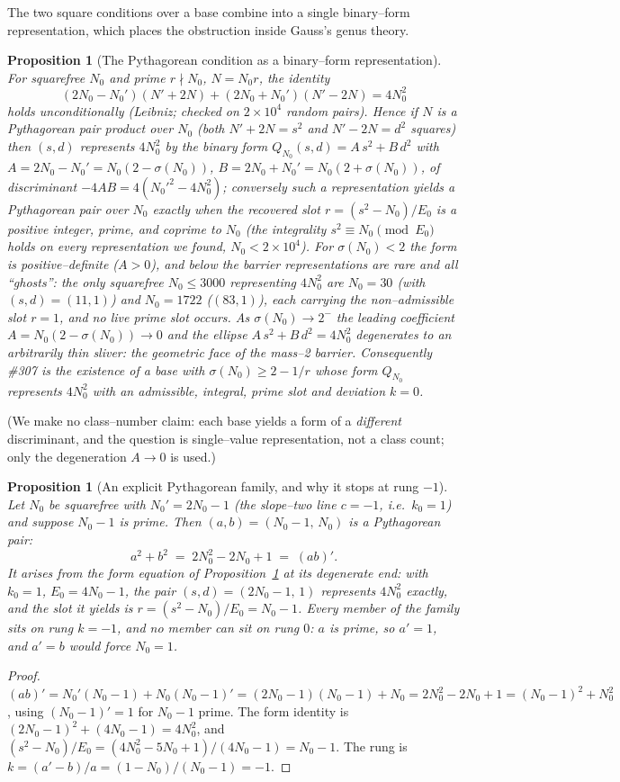 \documentclass[11pt]{article}
\newtheorem{proposition}[theorem]{Proposition}
\theoremstyle{definition}
\begin{document}
The two square conditions over a base combine into a single binary--form representation, which places
the obstruction inside Gauss's genus theory.

\begin{proposition}[The Pythagorean condition as a binary--form representation]\label{prop:form}
For squarefree $N_0$ and prime $r\nmid N_0$, $N=N_0r$, the identity
\[ (2N_0-N_0')(N'+2N)+(2N_0+N_0')(N'-2N)=4N_0^2 \]
holds unconditionally (Leibniz; checked on $2\times10^4$ random pairs). Hence if $N$ is a Pythagorean
pair product over $N_0$ (both $N'+2N=s^2$ and $N'-2N=d^2$ squares) then $(s,d)$ represents
$4N_0^2$ by the binary form $Q_{N_0}(s,d)=A\,s^2+B\,d^2$ with $A=2N_0-N_0'=N_0(2-\sigma(N_0))$,
$B=2N_0+N_0'=N_0(2+\sigma(N_0))$, of discriminant $-4AB=4(N_0'^2-4N_0^2)$; conversely such a
representation yields a Pythagorean pair over $N_0$ exactly when the recovered slot $r=(s^2-N_0)/E_0$
is a positive integer, prime, and coprime to $N_0$ (the integrality $s^2\equiv N_0\pmod{E_0}$ holds on
every representation we found, $N_0<2\times10^4$). For $\sigma(N_0)<2$ the form is positive--definite
($A>0$), and below the barrier representations are rare and all ``ghosts'': the only squarefree
$N_0\le3000$ representing $4N_0^2$ are $N_0=30$ (with $(s,d)=(11,1)$) and $N_0=1722$ ($(83,1)$), each
carrying the non--admissible slot $r=1$, and no live prime slot occurs. As $\sigma(N_0)\to2^-$ the
leading coefficient $A=N_0(2-\sigma(N_0))\to0$ and the ellipse $A\,s^2+B\,d^2=4N_0^2$ degenerates to an
arbitrarily thin sliver: the geometric face of the mass--2 barrier. Consequently \#307 is the existence
of a base with $\sigma(N_0)\ge2-1/r$ whose form $Q_{N_0}$ represents $4N_0^2$ with an admissible,
integral, \emph{prime} slot and deviation $k=0$.
\end{proposition}
\noindent (We make no class--number claim: each base yields a form of a \emph{different} discriminant,
and the question is single--value representation, not a class count; only the degeneration $A\to0$ is
used.)

\begin{proposition}[An explicit Pythagorean family, and why it stops at rung $-1$]\label{prop:family}
Let $N_0$ be squarefree with $N_0'=2N_0-1$ \textup{(}the slope--two line $c=-1$, i.e.\ $k_0=1$\textup{)}
and suppose $N_0-1$ is prime. Then $(a,b)=(N_0-1,\,N_0)$ is a Pythagorean pair:
\[ a^2+b^2\;=\;2N_0^2-2N_0+1\;=\;(ab)'. \]
It arises from the form equation of Proposition~\ref{prop:form} at its degenerate end: with $k_0=1$,
$E_0=4N_0-1$, the pair $(s,d)=(2N_0-1,\,1)$ represents $4N_0^2$ exactly, and the slot it yields is
$r=(s^2-N_0)/E_0=N_0-1$. Every member of the family sits on rung $k=-1$, and no member can sit on
rung $0$: $a$ is prime, so $a'=1$, and $a'=b$ would force $N_0=1$.
\end{proposition}
\begin{proof}
$(ab)'=N_0'(N_0-1)+N_0(N_0-1)'=(2N_0-1)(N_0-1)+N_0=2N_0^2-2N_0+1=(N_0-1)^2+N_0^2$, using
$(N_0-1)'=1$ for $N_0-1$ prime. The form identity is
$(2N_0-1)^2+(4N_0-1)=4N_0^2$, and $(s^2-N_0)/E_0=(4N_0^2-5N_0+1)/(4N_0-1)=N_0-1$. The rung is
$k=(a'-b)/a=(1-N_0)/(N_0-1)=-1$.
\end{proof}
\end{document}
